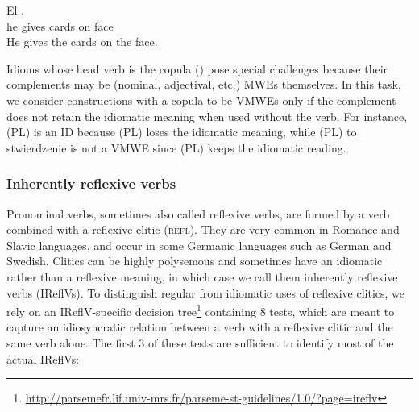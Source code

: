\documentclass[output=paper,
modfonts,
]{langscibook}
\begin{document}
\ea \label{ro:reveal-intentions}
\settowidth {}
\gll El    . \\
he gives cards on face\\ 
\glt He gives the cards on the face. 
\z


Idioms whose head verb is the copula () pose special challenges because their complements may be (nominal, adjectival, etc.) MWEs themselves. In this task, we consider constructions with a copula to be VMWEs only if the complement does not retain the idiomatic meaning when used without the verb. For instance, (PL)  is an ID because (PL)  loses the idiomatic meaning, while (PL) to stwierdzenie  is not a VMWE since (PL)  keeps the idiomatic reading.

\subsubsection{Inherently reflexive verbs}
\label{sec:ireflvs}
%
Pronominal verbs, sometimes also called reflexive verbs, are formed by a verb combined with a reflexive clitic (\textsc{refl}). %
They are very common in Romance and Slavic languages, and occur in some Germanic languages such as German and Swedish. Clitics can be highly polysemous and sometimes have an idiomatic rather than a reflexive meaning, in which case we call them inherently reflexive verbs (IReflVs). To distinguish regular from idiomatic uses of reflexive clitics, we rely on an IReflV-specific decision tree\footnote{\url{http://parsemefr.lif.univ-mrs.fr/parseme-st-guidelines/1.0/?page=ireflv}} containing 8 tests, which are meant to capture an idiosyncratic relation between a verb with a reflexive clitic and the same verb alone. The first 3 of these tests are sufficient to identify most of the actual IReflVs:
\end{document}

